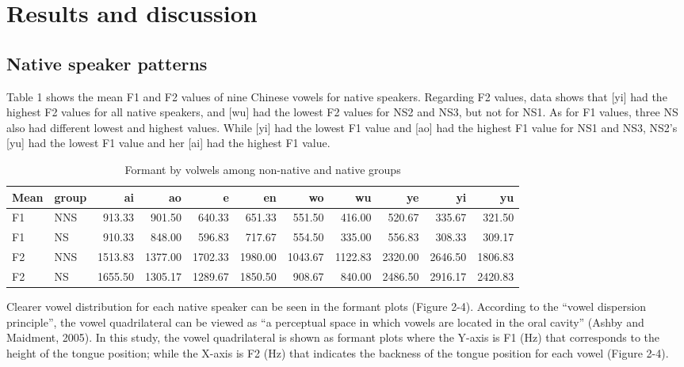 \documentclass[man, fleqn, noextraspace]{apa6}
\begin{document}
\section{Results and discussion}\label{results-and-discussion}

\subsection{Native speaker patterns}\label{native-speaker-patterns}

Table 1 shows the mean F1 and F2 values of nine Chinese vowels for
native speakers. Regarding F2 values, data shows that {[}yi{]} had the
highest F2 values for all native speakers, and {[}wu{]} had the lowest
F2 values for NS2 and NS3, but not for NS1. As for F1 values, three NS
also had different lowest and highest values. While {[}yi{]} had the
lowest F1 value and {[}ao{]} had the highest F1 value for NS1 and NS3,
NS2's {[}yu{]} had the lowest F1 value and her {[}ai{]} had the highest
F1 value.

\begin{table}

\caption{\label{tab:table1}Formant by volwels among non-native and native groups}
\centering
\begin{tabular}[t]{llrrrrrrrrr}
\toprule
Mean & group & ai & ao & e & en & wo & wu & ye & yi & yu\\
\midrule
F1 & NNS & 913.33 & 901.50 & 640.33 & 651.33 & 551.50 & 416.00 & 520.67 & 335.67 & 321.50\\
F1 & NS & 910.33 & 848.00 & 596.83 & 717.67 & 554.50 & 335.00 & 556.83 & 308.33 & 309.17\\
F2 & NNS & 1513.83 & 1377.00 & 1702.33 & 1980.00 & 1043.67 & 1122.83 & 2320.00 & 2646.50 & 1806.83\\
F2 & NS & 1655.50 & 1305.17 & 1289.67 & 1850.50 & 908.67 & 840.00 & 2486.50 & 2916.17 & 2420.83\\
\bottomrule
\end{tabular}
\end{table}

Clearer vowel distribution for each native speaker can be seen in the
formant plots (Figure 2-4). According to the \enquote{vowel dispersion
principle}, the vowel quadrilateral can be viewed as \enquote{a
perceptual space in which vowels are located in the oral cavity} (Ashby
and Maidment, 2005). In this study, the vowel quadrilateral is shown as
formant plots where the Y-axis is F1 (Hz) that corresponds to the height
of the tongue position; while the X-axis is F2 (Hz) that indicates the
backness of the tongue position for each vowel (Figure 2-4).
\end{document}
